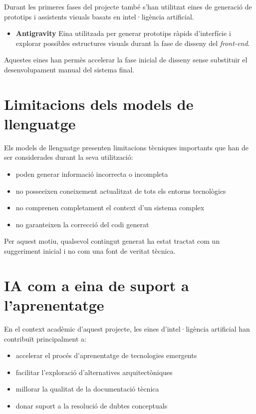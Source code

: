Durant les primeres fases del projecte també s'han utilitzat eines de generació de prototips i assistents visuals basats
en intel·ligència artificial.

\begin{itemize}

    \item \textbf{Antigravity} Eina utilitzada per generar prototips ràpids d'interfície i explorar possibles
    estructures visuals durant la fase de disseny del \textit{front-end}.

\end{itemize}

Aquestes eines han permès accelerar la fase inicial de disseny sense substituir el desenvolupament manual del sistema
final.


\section{Limitacions dels models de llenguatge}\label{sec:limitacions-dels-models-de-llenguatge}

Els models de llenguatge presenten limitacions tècniques importants que han de ser considerades durant la seva
utilització:

\begin{itemize}

    \item poden generar informació incorrecta o incompleta
    \item no posseeixen coneixement actualitzat de tots els entorns tecnològics
    \item no comprenen completament el context d'un sistema complex
    \item no garanteixen la correcció del codi generat

\end{itemize}

Per aquest motiu, qualsevol contingut generat ha estat tractat com un suggeriment inicial i no com una font de veritat
tècnica.


\section{IA com a eina de suport a l'aprenentatge}\label{sec:ia-com-a-eina-de-suport-a-l'aprenentatge}

En el context acadèmic d'aquest projecte, les eines d'intel·ligència artificial han contribuït principalment a:

\begin{itemize}

    \item accelerar el procés d'aprenentatge de tecnologies emergents
    \item facilitar l'exploració d'alternatives arquitectòniques
    \item millorar la qualitat de la documentació tècnica
    \item donar suport a la resolució de dubtes conceptuals

\end{itemize}

